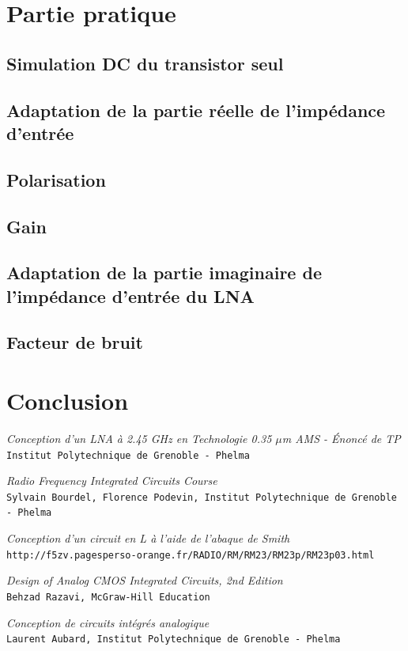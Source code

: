 \documentclass[a4paper]{article}
\begin{document}
\section{Partie pratique}
\subsection{Simulation DC du transistor seul}

\subsection{Adaptation de la partie r\'eelle de l'imp\'edance d'entr\'ee}

\subsection{Polarisation}
\subsection{Gain}
\subsection{Adaptation de la partie imaginaire de l'imp\'edance d'entr\'ee du LNA}
\subsection{Facteur de bruit}

\clearpage
\section*{Conclusion}




\begin{thebibliography}{9}

\textit{Conception d'un LNA \`a 2.45 GHz en Technologie 0.35 $\mu$m AMS - \'Enonc\'e de TP}\\
\texttt{Institut Polytechnique de Grenoble - Phelma}

\textit{Radio Frequency Integrated Circuits Course}\\
\texttt{Sylvain Bourdel, Florence Podevin, Institut Polytechnique de Grenoble - Phelma}

\textit{Conception d'un circuit en L \`a l'aide de l'abaque de Smith}\\
\texttt{http://f5zv.pagesperso-orange.fr/RADIO/RM/RM23/RM23p/RM23p03.html}

\textit{Design of Analog CMOS Integrated Circuits, 2nd Edition}\\
\texttt{Behzad Razavi, McGraw-Hill Education}

\textit{Conception de circuits int\'egr\'es analogique}\\
\texttt{Laurent Aubard, Institut Polytechnique de Grenoble - Phelma}

\end{thebibliography}
\end{document}
